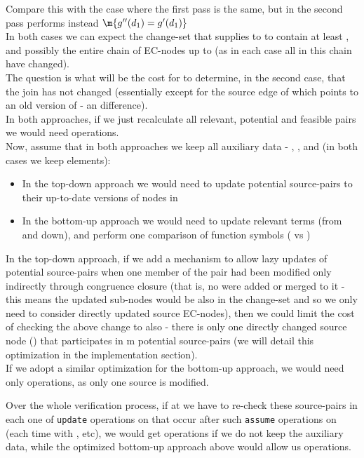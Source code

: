 Compare this with the case where the first pass is the same, but in the second pass  performs instead
$\m{g''(d_1)=g'(d_1)}$\\
In both cases we can expect the change-set that  supplies to  to contain at least , 
and possibly the entire chain of EC-nodes up to  (as in each case all \gfas{} in this chain have changed).\\
The question is what will be the cost for  to determine, in the second case, that the join has not changed 
(essentially except for the source edge of  which points to an old version of  - an  difference).\\
In both approaches, if we just recalculate all relevant, potential and feasible pairs we would need  operations.\\
Now, assume that in both approaches we keep all auxiliary data - , ,  and  (in both cases we keep  elements):
\begin{itemize}
	\item In the top-down approach we would need to update  potential source-pairs to their up-to-date versions of nodes in 
	\item In the bottom-up approach we would need to update  relevant terms (from  and down), and perform one comparison of function symbols ( vs )
\end{itemize}
In the top-down approach, if we add a mechanism to allow lazy updates of potential source-pairs when one member of the pair had been modified only indirectly through congruence closure (that is, no \GFAs{} were added or merged to it - this means the updated sub-nodes would be also in the change-set and so we only need to consider directly updated source EC-nodes),
then we could limit the cost of checking the above change to also  - 
there is only one directly changed source node () that participates in m potential source-pairs (we will detail this optimization in the implementation section).\\
If we adopt a similar optimization for the bottom-up approach, we would need only  operations, as only one source is modified.

Over the whole verification process, if at  we have to re-check these 
source-pairs in each one of  \lstinline{update} operations on  that occur after  such \lstinline{assume} operations on  (each time with , etc), 
we would get  operations if we do not keep the auxiliary data, while the optimized bottom-up approach above would allow us  operations.

